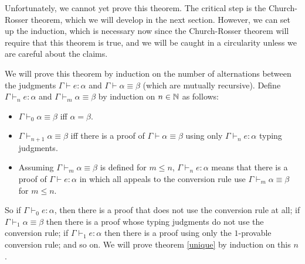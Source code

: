 Unfortunately, we cannot yet prove this theorem. The critical step is the Church-Rosser theorem, which we will develop in the next section. However, we can set up the induction, which is necessary now since the Church-Rosser theorem will require that this theorem is true, and we will be caught in a circularity unless we are careful about the claims.

We will prove this theorem by induction on the number of alternations between the judgments $\Gamma\vdash e:\alpha$ and $\Gamma\vdash\alpha\equiv\beta$ (which are mutually recursive). Define $\Gamma\vdash_n e:\alpha$ and $\Gamma\vdash_m\alpha\equiv\beta$ by induction on $n\in\mathbb{N}$ as follows:
\begin{itemize}
\item $\Gamma\vdash_0\alpha\equiv\beta$ iff $\alpha=\beta$.
\item $\Gamma\vdash_{n+1}\alpha\equiv\beta$ iff there is a proof of $\Gamma\vdash\alpha\equiv\beta$ using  only $\Gamma\vdash_n e:\alpha$ typing judgments.
\item Assuming $\Gamma\vdash_m\alpha\equiv\beta$ is defined for $m\le n$, $\Gamma\vdash_n e:\alpha$ means that there is a proof of $\Gamma\vdash e:\alpha$ in which all appeals to the conversion rule use $\Gamma\vdash_m\alpha\equiv\beta$ for $m\le n$.
\end{itemize}
So if $\Gamma\vdash_0 e:\alpha$, then there is a proof that does not use the conversion rule at all; if $\Gamma\vdash_1\alpha\equiv\beta$ then there is a proof whose typing judgments do not use the conversion rule; if $\Gamma\vdash_1 e:\alpha$ then there is a proof using only the $1$-provable conversion rule; and so on. We will prove theorem \ref{unique} by induction on this $n$.

